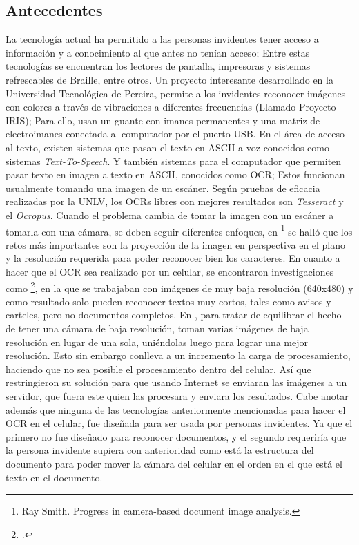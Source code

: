 \documentclass[a4paper, 11pt, oneside]{article}
\begin{document}
	\subsection {Antecedentes}
	La tecnología actual ha permitido a las personas invidentes tener acceso a información
	y a conocimiento al que antes no tenían acceso; Entre estas tecnologías se encuentran los
	lectores de pantalla, impresoras y sistemas refrescables de Braille, entre otros.
	Un proyecto interesante desarrollado en la Universidad Tecnológica de Pereira, permite
	a los invidentes reconocer imágenes con colores a través de vibraciones a diferentes
	frecuencias (Llamado Proyecto IRIS); Para ello, usan un guante con imanes 
	permanentes y una matriz de electroimanes conectada al computador por el puerto USB.
	\newline \newline
	En el área de acceso al texto, existen sistemas que pasan el texto en ASCII a voz
	conocidos como sistemas \textit{Text-To-Speech}. Y también sistemas para el computador
	que permiten pasar texto en imagen a texto en ASCII, conocidos como OCR; Estos funcionan
	usualmente tomando una imagen de un escáner. Según pruebas de eficacia realizadas por
	la UNLV, los OCRs libres con mejores resultados son	\textit{Tesseract} y el 
	\textit{Ocropus}. Cuando el problema cambia de tomar la imagen con un escáner a tomarla
	con una cámara, se deben seguir diferentes enfoques, en 
	\footnote{Ray Smith. Progress in camera-based document image analysis.} se halló que los
	retos más importantes son la proyección de la imagen en perspectiva en el plano y la 
	resolución requerida para poder reconocer bien los caracteres.
	En cuanto a hacer que el OCR sea realizado por un celular, se encontraron investigaciones
	como \footcite{mob_smallpic}, en la que se trabajaban con imágenes de muy baja resolución
	(640x480) y como resultado solo pueden reconocer textos muy cortos, tales como avisos
	y carteles,	pero no documentos completos.\newline
	En \cite{mob_withpc}, para tratar de equilibrar el hecho de tener una cámara de baja
	resolución, toman varias imágenes de baja resolución en lugar de una sola, uniéndolas
	luego para lograr una mejor resolución. Esto sin embargo conlleva a un incremento la
	carga de procesamiento, haciendo que no sea posible el procesamiento dentro del celular.
	Así que restringieron su solución para que usando Internet se enviaran las imágenes a un
	servidor, que fuera este quien las procesara y enviara los resultados.\newline
	Cabe anotar además que ninguna de las tecnologías anteriormente mencionadas para hacer
	el OCR en el celular, fue diseñada para ser usada por personas invidentes. Ya que el 
	primero no fue diseñado para reconocer documentos, y el segundo requeriría que la persona
	invidente supiera con anterioridad como está la estructura del documento para poder mover
	la cámara del celular en el orden en el que está el texto en el documento.
	
\end{document}

